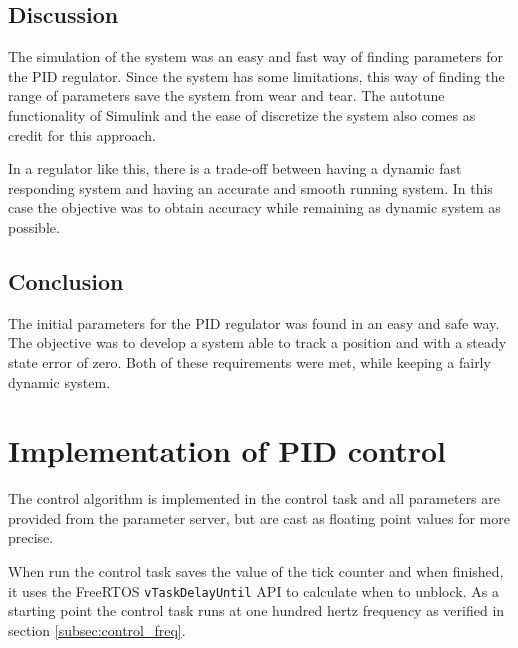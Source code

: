 \subsection{Discussion}
The simulation of the system was an easy and fast way of finding parameters for the PID regulator. Since the system has some limitations, this way of finding the range of parameters save the system from wear and tear. The autotune functionality of Simulink and the ease of discretize the system also comes as credit for this approach.

In a regulator like this, there is a trade-off between having a dynamic fast responding system and having an accurate and smooth running system. In this case the objective was to obtain accuracy while remaining as dynamic system as possible.

\subsection{Conclusion}
The initial parameters for the PID regulator was found in an easy and safe way. The objective was to develop a system able to track a position and with a steady state error of zero. Both of these requirements were met, while keeping a fairly dynamic system.


\section{Implementation of PID control}
The control algorithm is implemented in the control task and all parameters are provided from the parameter server, but are cast as  floating point values for more precise.

When run the control task saves the value of the tick counter and when finished, it uses the FreeRTOS \texttt{vTaskDelayUntil} API to calculate when to unblock. As a starting point the control task runs at one hundred hertz frequency as verified in section \ref{subsec:control_freq}.

